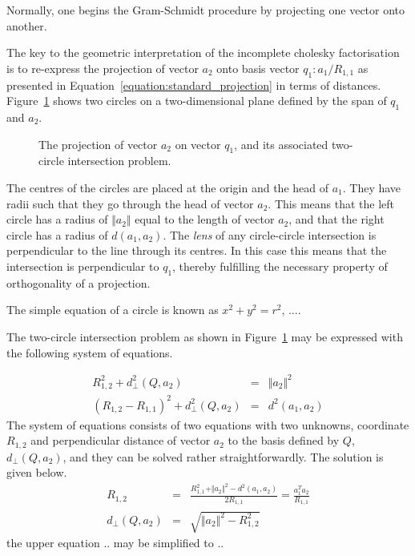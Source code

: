 \documentclass{article}
\newcommand{\sv}{Q}
\newcommand{\sve}{q}
\newcommand{\nonsve}{a}
\newcommand{\ce}{R}
\begin{document}
Normally, one begins the Gram-Schmidt procedure by projecting one
vector onto another. 

The key to the geometric interpretation of the incomplete
cholesky factorisation is to re-express the projection
of vector $\nonsve_{2}$ onto basis vector $\sve_{1}:\nonsve_{1}/\ce_{1,1}$
as presented in Equation~\ref{equation:standard_projection} in terms
of distances. Figure~\ref{figure:two_circle_intersection} shows two circles
on a two-dimensional plane defined by the span of $\sve_{1}$ and
$\nonsve_{2}$. %
\begin{figure}
\begin{center}
\end{center}
\caption{The projection of vector $\nonsve_{2}$ on vector $\sve_{1}$, and
its associated two-circle intersection problem.%
\label{figure:two_circle_intersection}}
\end{figure}
%
The centres of the circles are placed at the origin and the head
of $\nonsve_{1}$. They have radii such that they go through the head
of vector $\nonsve_{2}$. This means that the left circle has a radius
of $\Vert\nonsve_{2}\Vert$ equal to the length of vector $\nonsve_{2}$,
and that the right circle has a radius of $d(\nonsve_{1},\nonsve_{2})$.
The \emph{lens} of any circle-circle intersection is perpendicular
to the line through its centres. In this case this means that the
intersection is perpendicular to $\sve_{1}$, thereby fulfilling the
necessary property of orthogonality of a projection. 

The simple equation of a circle is known as $x^{2}+y^{2}=r^{2}$,
.... 

The two-circle intersection problem as shown in Figure~\ref{figure:two_circle_intersection}
may be expressed with the following system of equations. 

\begin{eqnarray*}
\ce_{1,2}^{2}+d_{\perp}^{2}(\sv,\nonsve_{2}) & = & \Vert\nonsve_{2}\Vert^{2}\\
(\ce_{1,2}-\ce_{1,1})^{2}+d_{\perp}^{2}(\sv,\nonsve_{2}) & = & d^{2}(\nonsve_{1},\nonsve_{2})\end{eqnarray*}
The system of equations consists of two equations with two unknowns,
coordinate $\ce_{1,2}$ and perpendicular distance of vector $\nonsve_{2}$
to the basis defined by $\sv$, $d_{\perp}(\sv,\nonsve_{2})$, and
they can be solved rather straightforwardly. The solution is given
below. \begin{eqnarray*}
\ce_{1,2} & = & \frac{\ce_{1,1}^{2}+\Vert\nonsve_{2}\Vert^{2}-d^{2}(\nonsve_{1},\nonsve_{2})}{2\ce_{1,1}}=\frac{\nonsve_{1}^{T}\nonsve_{2}}{\ce_{1,1}}\\
d_{\perp}(\sv,\nonsve_{2}) & = & \sqrt{\Vert\nonsve_{2}\Vert^{2}-\ce_{1,2}^{2}}\end{eqnarray*}
the upper equation .. may be simplified to .. 
\end{document}

